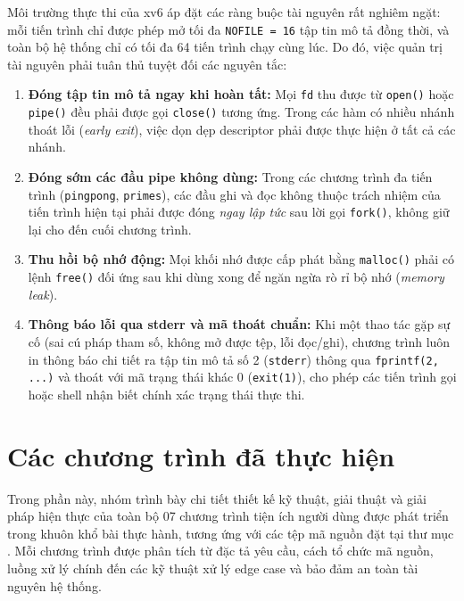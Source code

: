 \documentclass[12pt,a4paper]{article}
\begin{document}
Môi trường thực thi của xv6 áp đặt các ràng buộc tài nguyên rất nghiêm ngặt: mỗi tiến trình chỉ được phép mở tối đa \texttt{NOFILE = 16} tập tin mô tả đồng thời, và toàn bộ hệ thống chỉ có tối đa 64 tiến trình chạy cùng lúc. Do đó, việc quản trị tài nguyên phải tuân thủ tuyệt đối các nguyên tắc:
\begin{enumerate}
  \item \textbf{Đóng tập tin mô tả ngay khi hoàn tất:} Mọi \texttt{fd} thu được từ \texttt{open()} hoặc \texttt{pipe()} đều phải được gọi \texttt{close()} tương ứng. Trong các hàm có nhiều nhánh thoát lỗi (\textit{early exit}), việc dọn dẹp descriptor phải được thực hiện ở tất cả các nhánh.
  \item \textbf{Đóng sớm các đầu pipe không dùng:} Trong các chương trình đa tiến trình (\texttt{pingpong}, \texttt{primes}), các đầu ghi và đọc không thuộc trách nhiệm của tiến trình hiện tại phải được đóng \textit{ngay lập tức} sau lời gọi \texttt{fork()}, không giữ lại cho đến cuối chương trình.
  \item \textbf{Thu hồi bộ nhớ động:} Mọi khối nhớ được cấp phát bằng \texttt{malloc()} phải có lệnh \texttt{free()} đối ứng sau khi dùng xong để ngăn ngừa rò rỉ bộ nhớ (\textit{memory leak}).
  \item \textbf{Thông báo lỗi qua stderr và mã thoát chuẩn:} Khi một thao tác gặp sự cố (sai cú pháp tham số, không mở được tệp, lỗi đọc/ghi), chương trình luôn in thông báo chi tiết ra tập tin mô tả số 2 (\texttt{stderr}) thông qua \texttt{fprintf(2, ...)} và thoát với mã trạng thái khác 0 (\texttt{exit(1)}), cho phép các tiến trình gọi hoặc shell nhận biết chính xác trạng thái thực thi.
\end{enumerate}

\section{Các chương trình đã thực hiện}

Trong phần này, nhóm trình bày chi tiết thiết kế kỹ thuật, giải thuật và giải pháp hiện thực của toàn bộ 07 chương trình tiện ích người dùng được phát triển trong khuôn khổ bài thực hành, tương ứng với các tệp mã nguồn đặt tại thư mục . Mỗi chương trình được phân tích từ đặc tả yêu cầu, cách tổ chức mã nguồn, luồng xử lý chính đến các kỹ thuật xử lý edge case và bảo đảm an toàn tài nguyên hệ thống.
\end{document}
